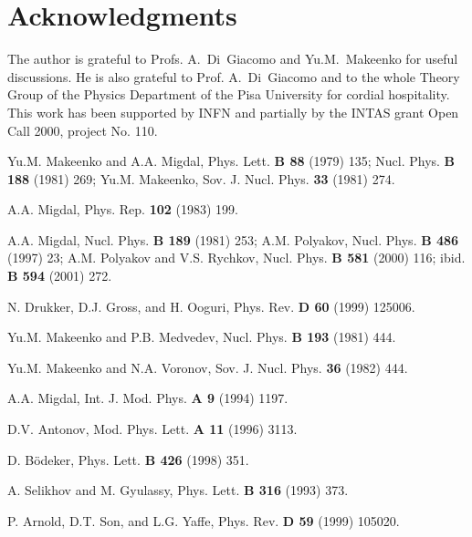 \documentclass[a4paper,12pt]{article}
\begin{document}
\section*{Acknowledgments}
The author is grateful to Profs.
A.~Di~Giacomo and Yu.M.~Makeenko for
useful discussions. He is also grateful to Prof. A.~Di~Giacomo and to the
whole Theory Group of the Physics Department of the Pisa University
for cordial hospitality. This work has been supported by INFN and partially by the
INTAS grant Open Call 2000, project No. 110.


\begin{thebibliography}{99}
Yu.M. Makeenko and A.A. Migdal, Phys. Lett. {\bf B 88} (1979) 135;
Nucl. Phys. {\bf B 188} (1981) 269;
Yu.M. Makeenko, Sov. J. Nucl. Phys. {\bf 33} (1981) 274.

A.A. Migdal, Phys. Rep. {\bf 102} (1983) 199.

A.A. Migdal, Nucl. Phys. {\bf B 189} (1981) 253;
A.M. Polyakov, Nucl. Phys. {\bf B 486} (1997) 23;
A.M. Polyakov and V.S. Rychkov, Nucl. Phys. {\bf B 581} (2000) 116; ibid. {\bf B 594} (2001) 272.


N. Drukker, D.J. Gross, and H. Ooguri, Phys. Rev. {\bf D 60} (1999) 125006.

Yu.M. Makeenko and P.B. Medvedev, Nucl. Phys. {\bf B 193} (1981) 444.

Yu.M. Makeenko and N.A. Voronov, Sov. J. Nucl. Phys. {\bf 36} (1982) 444.

A.A. Migdal, Int. J. Mod. Phys. {\bf A 9} (1994) 1197.

D.V. Antonov, Mod. Phys. Lett. {\bf A 11} (1996) 3113.

D. B\"odeker, Phys. Lett. {\bf B 426} (1998) 351.

A. Selikhov and M. Gyulassy, Phys. Lett. {\bf B 316} (1993) 373.

P. Arnold, D.T. Son, and L.G. Yaffe, Phys. Rev. {\bf D 59} (1999) 105020.


\end{thebibliography}
\end{document}
